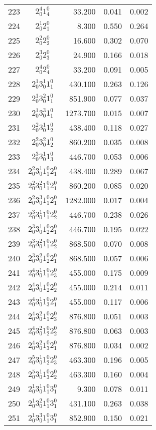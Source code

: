 \begin{table}
\begin{tabular}{rcrrr}
223&$2_0^4 1_4^0$& 33.200& 0.041& 0.002\\
224&$2_0^1 2_1^0$& 8.300& 0.550& 0.264\\
225&$2_0^2 2_2^0$& 16.600& 0.302& 0.070\\
226&$2_0^3 2_3^0$& 24.900& 0.166& 0.018\\
227&$2_0^4 2_4^0$& 33.200& 0.091& 0.005\\
228&$2_0^1 3_0^1 1_1^0$& 430.100& 0.263& 0.126\\
229&$2_0^1 3_0^2 1_1^0$& 851.900& 0.077& 0.037\\
230&$2_0^1 3_0^3 1_1^0$& 1273.700& 0.015& 0.007\\
231&$2_0^2 3_0^1 1_2^0$& 438.400& 0.118& 0.027\\
232&$2_0^2 3_0^2 1_2^0$& 860.200& 0.035& 0.008\\
233&$2_0^3 3_0^1 1_3^0$& 446.700& 0.053& 0.006\\
234&$2_0^2 3_0^1 1_1^0 2_1^0$& 438.400& 0.289& 0.067\\
235&$2_0^2 3_0^2 1_1^0 2_1^0$& 860.200& 0.085& 0.020\\
236&$2_0^2 3_0^3 1_1^0 2_1^0$& 1282.000& 0.017& 0.004\\
237&$2_0^3 3_0^1 1_1^0 2_2^0$& 446.700& 0.238& 0.026\\
238&$2_0^3 3_0^1 1_2^0 2_1^0$& 446.700& 0.195& 0.022\\
239&$2_0^3 3_0^2 1_1^0 2_2^0$& 868.500& 0.070& 0.008\\
240&$2_0^3 3_0^2 1_2^0 2_1^0$& 868.500& 0.057& 0.006\\
241&$2_0^4 3_0^1 1_1^0 2_3^0$& 455.000& 0.175& 0.009\\
242&$2_0^4 3_0^1 1_2^0 2_2^0$& 455.000& 0.214& 0.011\\
243&$2_0^4 3_0^1 1_3^0 2_1^0$& 455.000& 0.117& 0.006\\
244&$2_0^4 3_0^2 1_1^0 2_3^0$& 876.800& 0.051& 0.003\\
245&$2_0^4 3_0^2 1_2^0 2_2^0$& 876.800& 0.063& 0.003\\
246&$2_0^4 3_0^2 1_3^0 2_1^0$& 876.800& 0.034& 0.002\\
247&$2_0^5 3_0^1 1_2^0 2_3^0$& 463.300& 0.196& 0.005\\
248&$2_0^5 3_0^1 1_3^0 2_2^0$& 463.300& 0.160& 0.004\\
249&$2_0^1 3_0^1 1_1^0 3_1^0$& 9.300& 0.078& 0.011\\
250&$2_0^1 3_0^2 1_1^0 3_1^0$& 431.100& 0.263& 0.038\\
251&$2_0^1 3_0^3 1_1^0 3_1^0$& 852.900& 0.150& 0.021\\

\end{tabular}
\end{table}
